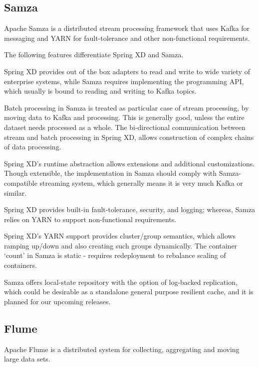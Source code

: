 \subsection{Samza}
Apache Samza\cite{samza} is a distributed stream processing framework that uses 
Kafka for messaging and YARN for fault-tolerance and other non-functional
requirements.

The following features differentiate Spring XD and Samza.

\begin{itemize*}
\item Spring XD provides out of the box adapters to read and write to wide
variety of enterprise systems, while Samza requires implementing the programming
API, which usually is bound to reading and writing to Kafka topics.
\item Batch processing in Samza is treated as particular case of stream
processing, by moving data to Kafka and processing. This is generally good, 
unless the entire dataset needs processed as a whole. The bi-directional 
communication between stream and batch processing in Spring XD, allows construction
of complex chains of data processing.
\item Spring XD's runtime abstraction allows extensions and additional
customizations. Though extensible, the implementation in Samza should comply with 
Samza-compatible streaming system, which generally means it is very much Kafka
or similar.
\item Spring XD provides built-in fault-tolerance, security, and logging; whereas, 
Samza relies on YARN to support non-functional requirements.
\item Spring XD's YARN support provides cluster/group semantics, which allows 
ramping up/down and also creating such groups dynamically. The container `count' 
in Samza is static - requires redeployment to rebalance scaling of containers.
\end{itemize*}

Samza offers local-state repository with the option of log-backed replication, 
which could be desirable as a standalone general purpose resilient cache, and it 
is planned for our upcoming releases. 

\subsection{Flume}
Apache Flume\cite{flume} is a distributed system for collecting, aggregating and 
moving large data sets.

